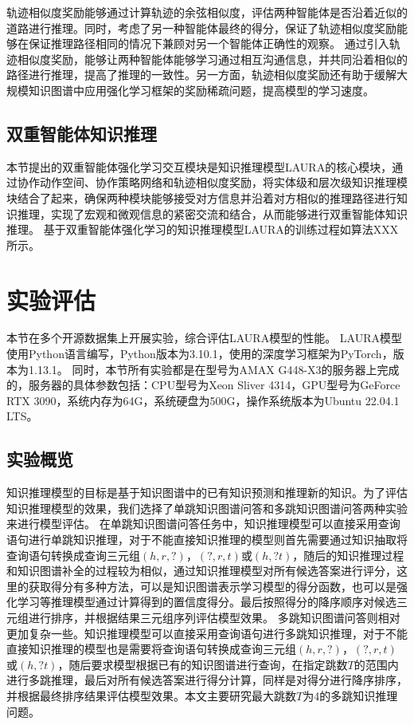 \documentclass[algorithmlist, AutoFakeBold, AutoFakeSlant, figurelist, tablelist, nomlist, masters]{seuthesix}
\begin{document}
轨迹相似度奖励能够通过计算轨迹的余弦相似度，评估两种智能体是否沿着近似的道路进行推理。同时，考虑了另一种智能体最终的得分，保证了轨迹相似度奖励能够在保证推理路径相同的情况下兼顾对另一个智能体正确性的观察。
通过引入轨迹相似度奖励，能够让两种智能体能够学习通过相互沟通信息，并共同沿着相似的路径进行推理，提高了推理的一致性。另一方面，轨迹相似度奖励还有助于缓解大规模知识图谱中应用强化学习框架的奖励稀疏问题，提高模型的学习速度。

\subsection{双重智能体知识推理}
本节提出的双重智能体强化学习交互模块是知识推理模型LAURA的核心模块，通过协作动作空间、协作策略网络和轨迹相似度奖励，将实体级和层次级知识推理模块结合了起来，确保两种模块能够接受对方信息并沿着对方相似的推理路径进行知识推理，实现了宏观和微观信息的紧密交流和结合，从而能够进行双重智能体知识推理。
基于双重智能体强化学习的知识推理模型LAURA的训练过程如算法XXX所示。

\section{实验评估}
本节在多个开源数据集上开展实验，综合评估LAURA模型的性能。
LAURA模型使用Python语言编写，Python版本为3.10.1，使用的深度学习框架为PyTorch，版本为1.13.1。
同时，本节所有实验都是在型号为AMAX G448-X3的服务器上完成的，服务器的具体参数包括：CPU型号为Xeon Sliver 4314，GPU型号为GeForce RTX 3090，系统内存为64G，系统硬盘为500G，操作系统版本为Ubuntu 22.04.1 LTS。

\subsection{实验概览}
知识推理模型的目标是基于知识图谱中的已有知识预测和推理新的知识。为了评估知识推理模型的效果，我们选择了单跳知识图谱问答和多跳知识图谱问答两种实验来进行模型评估。
在单跳知识图谱问答任务中，知识推理模型可以直接采用查询语句进行单跳知识推理，对于不能直接知识推理的模型则首先需要通过知识抽取将查询语句转换成查询三元组$(h, r, ?)$，$(?, r, t)$或$(h, ? t)$，随后的知识推理过程和知识图谱补全的过程较为相似，通过知识推理模型对所有候选答案进行评分，这里的获取得分有多种方法，可以是知识图谱表示学习模型的得分函数，也可以是强化学习等推理模型通过计算得到的置信度得分。最后按照得分的降序顺序对候选三元组进行排序，并根据结果三元组序列评估模型效果。
多跳知识图谱问答则相对更加复杂一些。知识推理模型可以直接采用查询语句进行多跳知识推理，对于不能直接知识推理的模型也是需要将查询语句转换成查询三元组$(h, r, ?)$，$(?, r, t)$或$(h, ? t)$，随后要求模型根据已有的知识图谱进行查询，在指定跳数$T$的范围内进行多跳推理，最后对所有候选答案进行得分计算，同样是对得分进行降序排序，并根据最终排序结果评估模型效果。本文主要研究最大跳数$T$为4的多跳知识推理问题。
\end{document}
